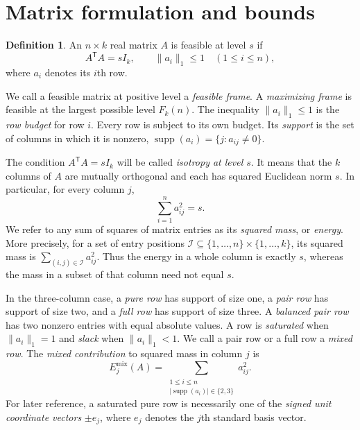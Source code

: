 \documentclass[11pt]{article}
\numberwithin{equation}{section}
\theoremstyle{definition}
\newtheorem{definition}[definition]{Definition}
\theoremstyle{definition}
\newcommand{\norm}[1]{\lVert#1\rVert}
\DeclareMathOperator{\supp}{supp}
\begin{document}
\section{Matrix formulation and bounds}
\label{sec:matrix}
\begin{definition}
An $n\times k$ real matrix $A$ is feasible at level $s$ if
\[
 A^{\mathsf T}A=sI_k,\qquad \norm{a_i}_1\le1\quad(1\le i\le n),
\]
where $a_i$ denotes its $i$th row.
\end{definition}

We call a feasible matrix at positive level a \emph{feasible frame}.
A \emph{maximizing frame} is feasible at the largest possible level
$F_k(n)$. The inequality $\|a_i\|_1\le1$ is the \emph{row budget}
for row $i$. Every row is subject to its own budget.
Its \emph{support} is the set of columns in which it is nonzero,
$\supp(a_i)=\{j:a_{ij}\ne0\}$.

The condition $A^{\mathsf T}A=sI_k$ will be called \emph{isotropy at
level $s$}. It means that the $k$ columns of $A$ are mutually
orthogonal and each has squared Euclidean norm $s$. In particular,
for every column $j$,
\[
 \sum_{i=1}^{n}a_{ij}^2=s.
\]
We refer to any sum of squares of matrix entries as its
\emph{squared mass}, or \emph{energy}. More precisely, for a set of
entry positions $\mathcal I\subseteq\{1,\ldots,n\}\times
\{1,\ldots,k\}$, its squared mass is
$\sum_{(i,j)\in\mathcal I}a_{ij}^2$. Thus the energy in a whole
column is exactly $s$, whereas the mass in a subset of that column
need not equal $s$.

In the three-column case, a \emph{pure row} has support of size one,
a \emph{pair row} has support of size two, and a \emph{full row}
has support of size three. A \emph{balanced pair row} has two
nonzero entries with equal absolute values. A row is
\emph{saturated} when $\|a_i\|_1=1$ and \emph{slack} when
$\|a_i\|_1<1$. We call a pair row or a full row a \emph{mixed row}.
The \emph{mixed contribution} to squared mass in column $j$ is
\[
 E_j^{\mathrm{mix}}(A)=
 \sum_{\substack{1\le i\le n\\|\supp(a_i)|\in\{2,3\}}}a_{ij}^2.
\]
For later reference, a saturated pure row is necessarily one of the
\emph{signed unit coordinate vectors} $\pm e_j$, where $e_j$ denotes
the $j$th standard basis vector.
\end{document}

